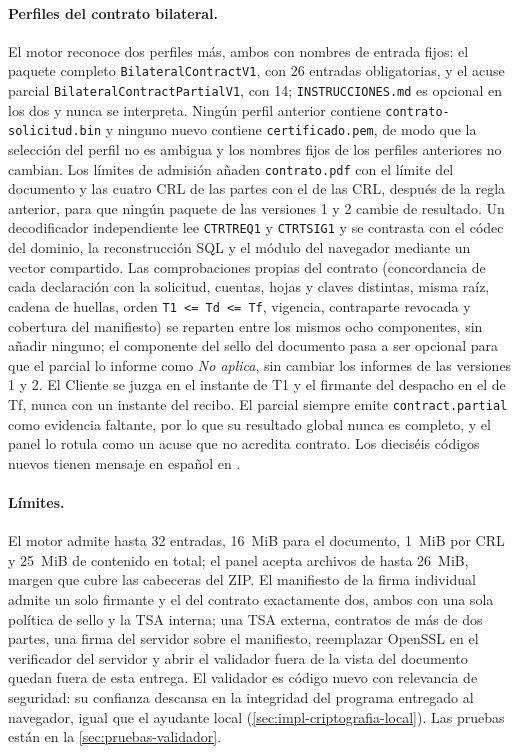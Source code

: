 \paragraph{Perfiles del contrato bilateral.} El motor reconoce dos perfiles más, ambos con nombres de entrada fijos: el paquete completo \texttt{BilateralContractV1}, con 26 entradas obligatorias, y el acuse parcial \texttt{BilateralContractPartialV1}, con 14; \texttt{INSTRUCCIONES.md} es opcional en los dos y nunca se interpreta. Ningún perfil anterior contiene \texttt{contrato-solicitud.bin} y ninguno nuevo contiene \texttt{certificado.pem}, de modo que la selección del perfil no es ambigua y los nombres fijos de los perfiles anteriores no cambian. Los límites de admisión añaden \texttt{contrato.pdf} con el límite del documento y las cuatro CRL de las partes con el de las CRL, después de la regla anterior, para que ningún paquete de las versiones 1 y 2 cambie de resultado. Un decodificador independiente lee \texttt{CTRTREQ1} y \texttt{CTRTSIG1} y se contrasta con el códec del dominio, la reconstrucción SQL y el módulo del navegador mediante un vector compartido. Las comprobaciones propias del contrato (concordancia de cada declaración con la solicitud, cuentas, hojas y claves distintas, misma raíz, cadena de huellas, orden \texttt{T1 <= Td <= Tf}, vigencia, contraparte revocada y cobertura del manifiesto) se reparten entre los mismos ocho componentes, sin añadir ninguno; el componente del sello del documento pasa a ser opcional para que el parcial lo informe como \emph{No aplica}, sin cambiar los informes de las versiones 1 y 2. El Cliente se juzga en el instante de T1 y el firmante del despacho en el de Tf, nunca con un instante del recibo. El parcial siempre emite \texttt{contract.partial} como evidencia faltante, por lo que su resultado global nunca es completo, y el panel lo rotula como un acuse que no acredita contrato. Los dieciséis códigos nuevos tienen mensaje en español en .

\paragraph{Límites.} El motor admite hasta 32 entradas, 16~MiB para el documento, 1~MiB por CRL y 25~MiB de contenido en total; el panel acepta archivos de hasta 26~MiB, margen que cubre las cabeceras del ZIP. El manifiesto de la firma individual admite un solo firmante y el del contrato exactamente dos, ambos con una sola política de sello y la TSA interna; una TSA externa, contratos de más de dos partes, una firma del servidor sobre el manifiesto, reemplazar OpenSSL en el verificador del servidor y abrir el validador fuera de la vista del documento quedan fuera de esta entrega. El validador es código nuevo con relevancia de seguridad: su confianza descansa en la integridad del programa entregado al navegador, igual que el ayudante local (\cref{sec:impl-criptografia-local}). Las pruebas están en la \cref{sec:pruebas-validador}.

